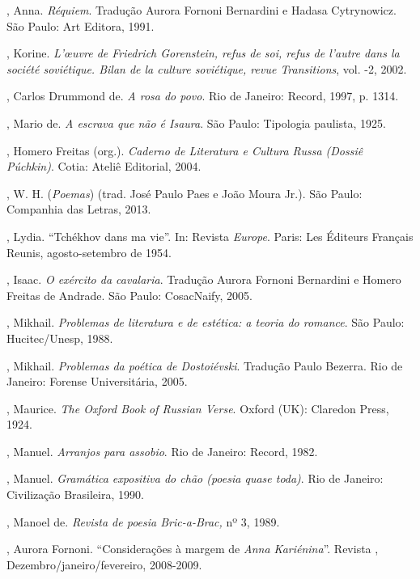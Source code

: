 \begin{Parskip}

, Anna. \emph{Réquiem}. Tradução Aurora Fornoni Bernardini e Hadasa Cytrynowicz. São Paulo: Art Editora, 1991.

, Korine. \emph{L’œuvre de Friedrich Gorenstein, refus de soi, refus de l'autre dans la société
 soviétique. Bilan de la culture soviétique, revue Transitions}, vol. -2, 2002.

, Carlos Drummond de. \emph{A rosa do povo}. Rio de Janeiro:
Record, 1997, p. 13­14.

, Mario de. \emph{A escrava que não é Isaura}. São Paulo: Tipologia paulista, 1925.

, Homero Freitas (org.). \emph{Caderno de Literatura e Cultura
Russa (Dossiê Púchkin)}. Cotia: Ateliê Editorial, 2004.

, W. H. \emph{} (\emph{Poemas}) (trad. José Paulo Paes e
João Moura Jr.). São Paulo: Companhia das Letras, 2013.

, Lydia. ``Tchékhov dans ma vie''. In: Revista \emph{Europe}.
Paris: Les Éditeurs Français Reunis, agosto-setembro de 1954.

, Isaac. \emph{O exército da cavalaria}. Tradução Aurora Fornoni Bernardini e Homero Freitas de
Andrade. São Paulo: CosacNaify, 2005.

, Mikhail. \emph{Problemas de literatura e de estética: a teoria do romance}. São Paulo: Hucitec/Unesp, 1988.

, Mikhail. \emph{Problemas da poética de Dostoiévski}. Tradução Paulo
Bezerra. Rio de Janeiro: Forense Universitária, 2005.

, Maurice. \emph{The Oxford Book of
Russian Verse}. Oxford (UK): Claredon Press, 1924. 

, Manuel. \emph{Arranjos para assobio}. Rio de Janeiro: Record, 1982.

, Manuel. \emph{Gramática expositiva do chão (poesia quase toda)}.
Rio de Janeiro: Civilização Brasileira, 1990.

, Manoel de. \emph{Revista de poesia Bric-a-Brac,} nº 3, 1989.

, Aurora Fornoni. ``Considerações à margem de \emph{Anna
Kariénina}''. Revista , Dezembro/janeiro/fevereiro, 2008-2009.


\end{Parskip}
